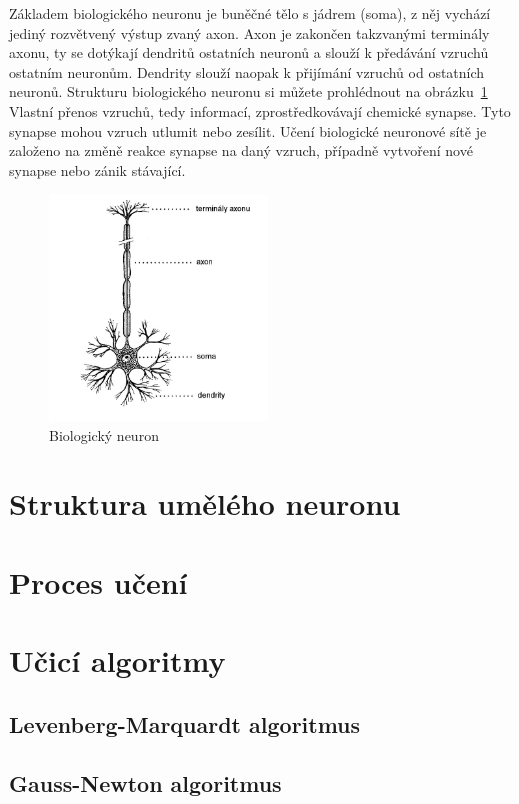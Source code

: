 \documentclass[11pt,twoside,a4paper]{book}
\begin{document}
Základem biologického neuronu je buněčné tělo s jádrem (soma), z něj vychází jediný rozvětvený výstup zvaný axon. Axon je zakončen takzvanými terminály axonu, ty se dotýkají dendritů ostatních neuronů a slouží k předávání vzruchů ostatním neuronům. Dendrity slouží naopak k přijímání vzruchů od ostatních neuronů. Strukturu biologického neuronu si můžete prohlédnout na obrázku~\ref{fig:bioneuron} Vlastní přenos vzruchů, tedy informací, zprostředkovávají chemické synapse. Tyto synapse mohou vzruch utlumit nebo zesílit. Učení biologické neuronové sítě je založeno na změně reakce synapse na daný vzruch, případně vytvoření nové synapse nebo zánik stávající.

\begin{figure}[!h]
\begin{center}
\includegraphics[height=6cm]{figures/bioneuron.png}
\caption{Biologický neuron\citep{teoret}}
\label{fig:bioneuron}
\end{center}
\end{figure}

\section{Struktura umělého neuronu}
\section{Proces učení}
\section{Učicí algoritmy}
\subsection{Levenberg-Marquardt algoritmus}
\subsection{Gauss-Newton algoritmus}
\end{document}
